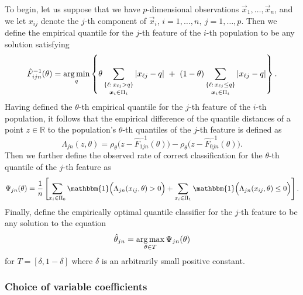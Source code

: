 To begin, let us suppose that we have $p$-dimensional observations
$\vec{x}_1, \dots, \vec{x}_n$, and we let $x_{ij}$ denote the $j$-th component
of $\vec{x}_i$, $i = 1, \dots, n,~ j = 1, \dots, p$.  Then we define the
empirical quantile for the $j$-th feature of the $i$-th population to be any
solution satisfying
\begin{equation}
  \label{eq:multivariate-empirical-quantile}
  \hat{F}_{ijn}^{-1} (\theta) = \operatorname*{arg\,min}_q \left\{
    \theta \sum_{\substack{ \{ \ell:\, x_{\ell j} > q \} \\[0.5mm] \bm{x}_i \in \Pi_i }}
    |x_{\ell j} - q| ~+~
    (1 - \theta)
    \sum_{\substack{ \{ \ell:\, x_{\ell j} \leq q \} \\[0.5mm] \bm{x}_i \in \Pi_i }}
    |x_{\ell j} - q|
  \right\}.
\end{equation}
Having defined the $\theta$-th empirical quantile for the $j$-th feature of the
$i$-th population, it follows that the empirical difference of the quantile
distances of a point $z \in \mathbb{R}$ to the population's $\theta$-th
quantiles of the $j$-th feature is defined as
\[
  \Lambda_{jn} (z, \theta) =
  \rho_{\theta}\Big(z - \hat{F}_{1jn}^{-1}(\theta)\Big) -
  \rho_{\theta}\Big(z - \hat{F}_{0jn}^{-1}(\theta)\Big).
\]
Then we further define the observed rate of correct classification for the
$\theta$-th quantile of the $j$-th feature as
\begin{equation}
  \Psi_{jn}(\theta) = \frac{1}{n}
  \left[
    \sum_{x_i \in \Pi_0}
    \mathbbm{1}\Big( \Lambda_{jn}(x_{ij}, \theta) > 0 \Big) +
    \sum_{x_i \in \Pi_1}
    \mathbbm{1}\Big( \Lambda_{jn}(x_{ij}, \theta) \leq 0 \Big)
  \right].
\end{equation}
Finally, define the empirically optimal quantile classifier for the $j$-th
feature to be any solution to the equation
\begin{equation}
  \hat{\theta}_{jn} = \operatorname*{arg\,max}_{\theta \in T} \Psi_{jn}(\theta)
\end{equation}
for $T = [ \delta, 1 - \delta]$ where $\delta$ is an arbitrarily small positive
constant.




\subsubsection{Choice of variable coefficients}
\label{sec:variable-coefficients}

